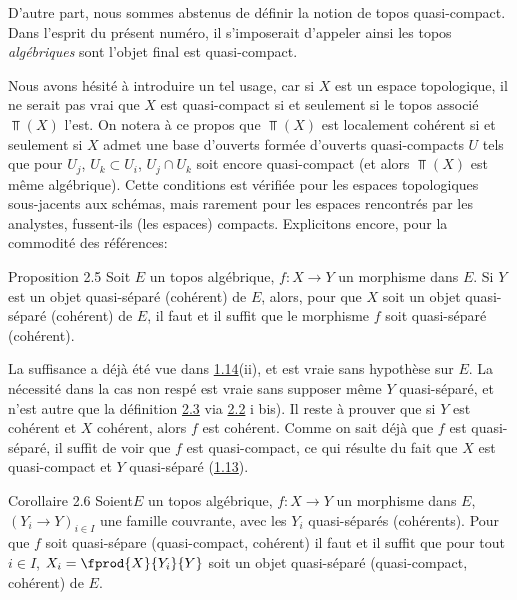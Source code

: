D'autre part, nous sommes abstenus de définir la notion de topos
quasi-compact. Dans l'esprit du présent numéro, il s'imposerait
d'appeler ainsi les topos \emph{algébriques} sont l'objet final est
quasi-compact.

Nous \pageoriginale avons hésité à introduire un tel usage, car si
$X$ est un espace topologique, il ne serait pas vrai que $X$ est
quasi-compact si et seulement si le topos associé $\Top(X)$ l'est.
On notera à ce propos que $\Top(X)$ est localement cohérent si et
seulement si $X$ admet une base d'ouverts formée d'ouverts
quasi-compacts $U$ tels que pour $U_j$, $U_k \subset U_i$, $U_j \cap
U_k$ soit encore quasi-compact (et alors $\Top(X)$ est même
algébrique). Cette conditions est vérifiée pour les espaces
topologiques sous-jacents aux schémas, mais rarement pour les
espaces rencontrés par les analystes, fussent-ils (les espaces)
compacts. Explicitons encore, pour la commodité des références:

\begin{enonce*}{Proposition 2.5}
Soit $E$ un topos algébrique, $f : X \to Y$ un morphisme dans $E$. Si
$Y$ est un objet quasi-séparé (\resp cohérent) de $E$, alors, pour que
$X$ soit un objet quasi-séparé (\resp cohérent) de $E$, il faut et il
suffit que le morphisme $f$ soit quasi-séparé (\resp cohérent).
\end{enonce*}

La suffisance a déjà été vue dans \hyperref[VI.prop1.14]{1.14}(ii), et est vraie sans
hypothèse sur $E$. La nécessité dans la cas non respé est vraie sans
supposer même $Y$ quasi-séparé, et n'est  autre que la définition \hyperref[VI.def2.3]{2.3}
via \hyperref[VI.prop2.2]{2.2} i bis). Il reste à prouver que si $Y$ est cohérent et $X$
cohérent, alors $f$ est cohérent. Comme on sait déjà que $f$ est
quasi-séparé, il suffit de voir que $f$ est quasi-compact, ce qui
résulte du fait que $X$ est quasi-compact et $Y$ quasi-séparé (\hyperref[VI.def1.13]{1.13}).

\begin{enonce*}{Corollaire 2.6}
Soient\pageoriginale $E$ un topos algébrique, $f: X \to Y$ un
morphisme dans $E$, $(Y_i \to Y)_{i \in I}$ une famille couvrante, avec les $Y_i$
quasi-séparés (\resp  cohérents). Pour que $f$ soit quasi-sépare
(\resp quasi-compact, \resp cohérent) il faut et il suffit que pour
tout $i \in I$, $X_i = \fprod{X}{Y_i}{Y}$ soit un objet quasi-séparé
(\resp quasi-compact, \resp cohérent) de $E$.
\end{enonce*}

